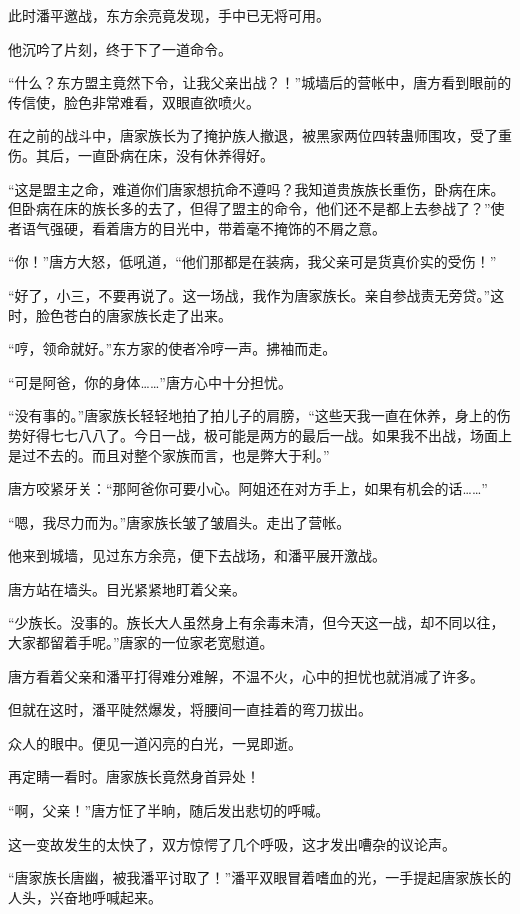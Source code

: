 \begin{this_body}
此时潘平邀战，东方余亮竟发现，手中已无将可用。

他沉吟了片刻，终于下了一道命令。

“什么？东方盟主竟然下令，让我父亲出战？！”城墙后的营帐中，唐方看到眼前的传信使，脸色非常难看，双眼直欲喷火。

在之前的战斗中，唐家族长为了掩护族人撤退，被黑家两位四转蛊师围攻，受了重伤。其后，一直卧病在床，没有休养得好。

“这是盟主之命，难道你们唐家想抗命不遵吗？我知道贵族族长重伤，卧病在床。但卧病在床的族长多的去了，但得了盟主的命令，他们还不是都上去参战了？”使者语气强硬，看着唐方的目光中，带着毫不掩饰的不屑之意。

“你！”唐方大怒，低吼道，“他们那都是在装病，我父亲可是货真价实的受伤！”

“好了，小三，不要再说了。这一场战，我作为唐家族长。亲自参战责无旁贷。”这时，脸色苍白的唐家族长走了出来。

“哼，领命就好。”东方家的使者冷哼一声。拂袖而走。

“可是阿爸，你的身体……”唐方心中十分担忧。

“没有事的。”唐家族长轻轻地拍了拍儿子的肩膀，“这些天我一直在休养，身上的伤势好得七七八八了。今日一战，极可能是两方的最后一战。如果我不出战，场面上是过不去的。而且对整个家族而言，也是弊大于利。”

唐方咬紧牙关：“那阿爸你可要小心。阿姐还在对方手上，如果有机会的话……”

“嗯，我尽力而为。”唐家族长皱了皱眉头。走出了营帐。

他来到城墙，见过东方余亮，便下去战场，和潘平展开激战。

唐方站在墙头。目光紧紧地盯着父亲。

“少族长。没事的。族长大人虽然身上有余毒未清，但今天这一战，却不同以往，大家都留着手呢。”唐家的一位家老宽慰道。

唐方看着父亲和潘平打得难分难解，不温不火，心中的担忧也就消减了许多。

但就在这时，潘平陡然爆发，将腰间一直挂着的弯刀拔出。

众人的眼中。便见一道闪亮的白光，一晃即逝。

再定睛一看时。唐家族长竟然身首异处！

“啊，父亲！”唐方怔了半晌，随后发出悲切的呼喊。

这一变故发生的太快了，双方惊愕了几个呼吸，这才发出嘈杂的议论声。

“唐家族长唐幽，被我潘平讨取了！”潘平双眼冒着嗜血的光，一手提起唐家族长的人头，兴奋地呼喊起来。


\end{this_body}

